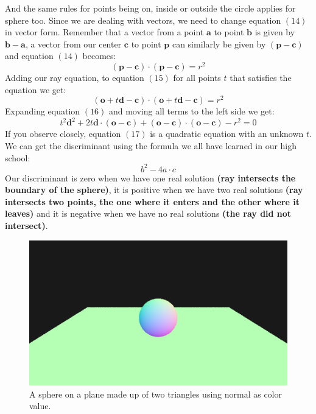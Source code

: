 \documentclass[11pt,a4paper]{article}
\begin{document}
	And the same rules for points being on, inside or outside the circle applies for sphere too. Since we are dealing with vectors, we need to change equation $(14)$ in vector form. Remember that a vector from a point $\boldsymbol{a}$ to point $\boldsymbol{b}$ is given by $\boldsymbol{b}-\boldsymbol{a}$, a vector from our center $\boldsymbol{c}$ to point $\boldsymbol{p}$ can similarly be given by $(\boldsymbol{p}-\boldsymbol{c})$ and equation $(14)$ becomes:
	\begin{equation}
	(\boldsymbol{p}-\boldsymbol{c})\cdot(\boldsymbol{p}-\boldsymbol{c})=r^2
	\end{equation}
	Adding our ray equation, to equation $(15)$ for all points $t$ that satisfies the equation we get:
	\begin{equation}
	(\boldsymbol{o} + t\boldsymbol{d}-\boldsymbol{c})\cdot(\boldsymbol{o} + t\boldsymbol{d}-\boldsymbol{c})=r^2
	\end{equation}
	Expanding equation $(16)$ and moving all terms to the left side we get:
	\begin{equation}
	t^2\boldsymbol{d}^2 + 2t\boldsymbol{d}\cdot(\boldsymbol{o} - \boldsymbol{c})+(\boldsymbol{o}-\boldsymbol{c})\cdot(\boldsymbol{o}-\boldsymbol{c})-r^2=0
	\end{equation}
	If you observe closely, equation $(17)$ is a quadratic equation with an unknown $t$. We can get the discriminant using the formula we all have learned in our high school:
	\begin{equation}
		b^2-4a \cdot c
	\end{equation}
	Our discriminant is zero when we have one real solution \textbf{(ray intersects the boundary of the sphere)}, it is positive when we have two real solutions \textbf{(ray intersects two points, the one where it enters and the other where it leaves)} and it is negative when we have no real solutions \textbf{(the ray did not intersect)}.

\begin{figure}[htp]
	\centering
	\includegraphics[width=.45\textwidth]{ray_sphere_triangle.png}\quad
	\caption{A sphere on a plane made up of two triangles using normal as color value.}
\end{figure}
\end{document}
